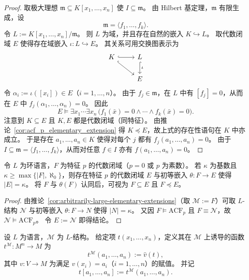 \documentclass[lang=cn,a4paper,newtx,section]{elegantbook}
\begin{document}
\begin{proof}
取极大理想 $\mathfrak m\subseteq K[x_1,\dots,x_n]$ 使 $I\subseteq\mathfrak m$。
由 Hilbert 基定理，$\mathfrak m$ 有限生成，设
\[
  \mathfrak m=\langle f_1,\dots,f_k\rangle.
\]
令 $L:=K[x_1,\dots,x_n]/\mathfrak m$。
则 $L$ 为域，并且存在自然的嵌入 $K\hookrightarrow L$。
取代数闭域 $E$ 使得存在域嵌入 $\iota:L\hookrightarrow E$。
其关系可用交换图表示为
\[
\begin{tikzcd}
  K \arrow[r, hook] \arrow[dr, hook] & L \arrow[d, hook, "\iota"] \\
  & E
\end{tikzcd}
\]
令 $\alpha_i:=\iota([x_i])\in E$（$i=1,\dots,n$）。
由于 $f_j\in\mathfrak m$，在 $L$ 中有 $[f_j]=0$，从而在 $E$ 中 $f_j(\alpha_1,\dots,\alpha_n)=0$。
因此
\[
  E\models\exists x_1\cdots\exists x_n\,\bigl(f_1(\bar x)=0\wedge\cdots\wedge f_k(\bar x)=0\bigr).
\]
注意到 $K\subseteq E$ 且 $K,E$ 都是代数闭域（同特征）。
由推论~\ref{cor:acf_p_elementary_extension} 得 $K\preccurlyeq E$，故上式的存在性语句在 $K$ 中亦成立。
于是存在 $a_1,\dots,a_n\in K$ 使得对每个 $j$ 都有 $f_j(a_1,\dots,a_n)=0$。
由于 $I\subseteq\mathfrak m=\langle f_1,\dots,f_k\rangle$，从而对任意 $f\in I$ 亦有 $f(a_1,\dots,a_n)=0$。
\end{proof}

\begin{corollary}
\label{acf_p_arbitrarily_large_elementary_extensions}
令 $L$ 为环语言，$F$ 为特征 $p$ 的代数闭域（$p=0$ 或 $p$ 为素数）。
若 $\kappa$ 为基数且 $\kappa\ge\max\{\lvert F\rvert,\aleph_0\}$，则存在特征 $p$ 的代数闭域 $E$ 与初等嵌入 $\theta:F\to E$ 使得 $\lvert E\rvert=\kappa$。
将 $F$ 与 $\theta(F)$ 认同后，可视为 $F\subseteq E$ 且 $F\preccurlyeq E$。
\end{corollary}

 \begin{proof}
 由推论~\ref{cor:arbitrarily-large-elementary-extensions}（取 $\mathcal M:=F$）可取 $L$-结构 $\mathcal N$ 与初等嵌入 $\theta:F\to N$ 使得 $\lvert N\rvert=\kappa$。
 又因 $F\models\mathrm{ACF}_p$ 且 $F\equiv\mathcal N$，故 $\mathcal N\models\mathrm{ACF}_p$。
 令 $E:=\mathcal N$ 即得结论。
 \end{proof}

\begin{definition}[项诱导的函数]
\label{term-induced-function}
设 $L$ 为语言，$\mathcal M$ 为 $L$-结构。
给定项 $t(x_1,\dots,x_n)$，定义其在 $\mathcal M$ 上诱导的函数 $t^{\mathcal M}:M^n\to M$ 为
\[
  t^{\mathcal M}(a_1,\dots,a_n):=\hat v(t),
\]
其中 $v:V\to M$ 为满足 $v(x_i)=a_i$（$i=1,\dots,n$）的赋值。
并记
\[
  t[a_1,\dots,a_n]:=t^{\mathcal M}(a_1,\dots,a_n).
\]
\end{definition}
\end{document}
